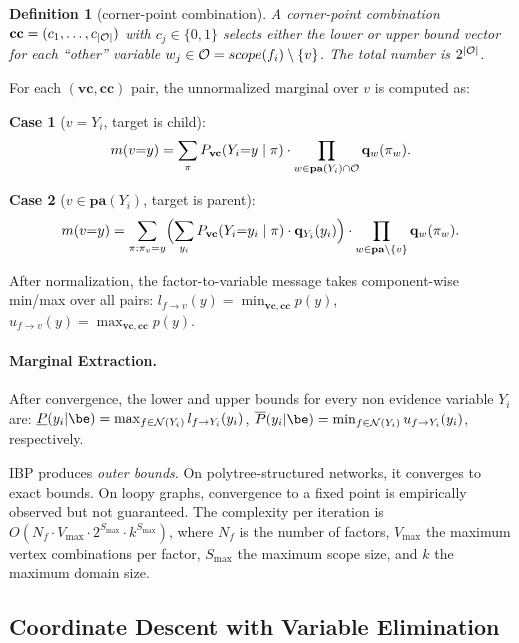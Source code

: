 \documentclass{article}
\newtheorem{definition}{Definition}
\begin{document}
\begin{definition}[corner-point combination]
    A \emph{corner-point combination} $\mathbf{cc} = (c_1, \dots, c_{|\mathcal{O}|})$ with $c_j \in \{0,1\}$ selects either the lower or upper bound vector for each ``other'' variable $w_j \in \mathcal{O} = scope(f_i) \setminus \{v\}$. The total number is $2^{|\mathcal{O}|}$.
\end{definition}

For each $(\mathbf{vc}, \mathbf{cc})$ pair, the unnormalized marginal over $v$ is computed as:

\noindent\textbf{Case 1} ($v = Y_i$, target is child):
\begin{equation}\label{eq:ibp-case1}
  m(v{=}y) = \sum_{\pi} P_{\mathbf{vc}}(Y_i{=}y \mid \pi)
  \cdot \prod_{w \in \mathbf{pa}(Y_i) \cap \mathcal{O}} \mathbf{q}_w(\pi_w).
\end{equation}

\noindent\textbf{Case 2} ($v \in \mathbf{pa}(Y_i)$, target is parent):
\begin{equation}\label{eq:ibp-case2}
  m(v{=}y) = \sum_{\pi : \pi_v = y}
  \Bigl(\sum_{y_i} P_{\mathbf{vc}}(Y_i{=}y_i \mid \pi) \cdot \mathbf{q}_{Y_i}(y_i)\Bigr)
  \cdot \prod_{w \in \mathbf{pa} \setminus \{v\}} \mathbf{q}_w(\pi_w).
\end{equation}

After normalization, the factor-to-variable message takes component-wise min/max over all pairs:
$l_{f \to v}(y) = \min_{\mathbf{vc},\mathbf{cc}} p(y)$, \;
$u_{f \to v}(y) = \max_{\mathbf{vc},\mathbf{cc}} p(y)$.

\paragraph{Marginal Extraction.} After convergence, the lower and upper bounds for every non evidence variable $Y_i$ are:
$\underline{P}(y_i|\be) = \max_{f \in \cN(Y_i)} l_{f \to Y_i}(y_i)$, \;
$\overline{P}(y_i|\be) = \min_{f \in \cN(Y_i)} u_{f \to Y_i}(y_i)$, respectively.

IBP produces \emph{outer bounds}. On polytree-structured networks, it converges to exact bounds. On loopy graphs, convergence to a fixed point is empirically observed but not guaranteed. The complexity per iteration is $O(N_f \cdot V_{\max} \cdot 2^{S_{\max}} \cdot k^{S_{\max}})$, where $N_f$ is the number of factors, $V_{\max}$ the maximum vertex combinations per factor, $S_{\max}$ the maximum scope size, and $k$ the maximum domain size.


\subsection{Coordinate Descent with Variable Elimination}
\end{document}
